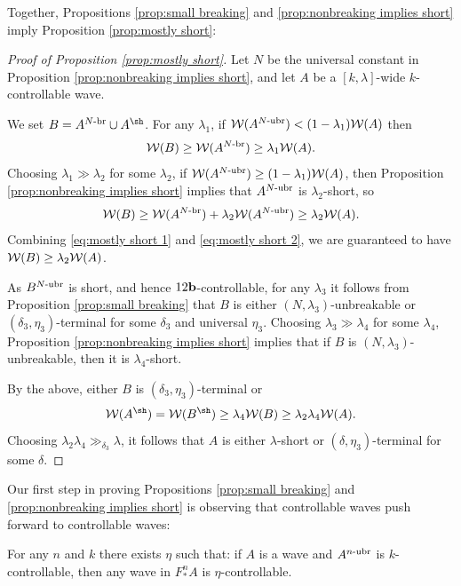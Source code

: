 \documentclass[12pt]{amsart}
\begin{document}
Together, Propositions \ref{prop:small breaking} and \ref{prop:nonbreaking implies short} imply Proposition  \ref{prop:mostly short}:
\begin{proof}[Proof of Proposition  \ref{prop:mostly short}]
	Let $N$ be the universal constant in Proposition \ref{prop:nonbreaking implies short}, and let $A$ be a $[k, \lambda]$-wide $k$-controllable wave. 
	
	
	We set $B= A^{N\mathhyphen\br}\cup A^{\sh}$. 	
	For any $\lambda_1$, if $\mathcal W(A^{N\text{-}{\mathrm{ubr}}})< (1-\lambda_1)\mathcal W(A)$ then 
	\begin{equation}\label{eq:mostly short 1}
		\mathcal W(B)\geq \mathcal W(A^{N\text{-}{\mathrm{br}}})\geq \lambda_1\mathcal W(A).
	\end{equation}
	Choosing $\lambda_1\gg\lambda_2$ for some $\lambda_2$, if $\mathcal W(A^{N\text{-}{\mathrm{ubr}}})\geq (1-\lambda_1)\mathcal W(A)$, then
	Proposition \ref{prop:nonbreaking implies short} implies that $A^{N\text{-}{\mathrm{ubr}}}$ is $\lambda_2$-short, so 
	\begin{equation}\label{eq:mostly short 2}
		\mathcal W(B)\geq \mathcal W(A^{N\text{-}{\mathrm{br}}})+ \lambda_2\mathcal W(A^{N\text{-}{\mathrm{ubr}}})\geq \lambda_2\mathcal W(A).
	\end{equation}
	Combining \eqref{eq:mostly short 1} and \eqref{eq:mostly short 2}, we are guaranteed to have $\mathcal W(B)\geq \lambda_2\mathcal W(A)$.
	
	As $B^{N\text{-}{\mathrm{ubr}}}$ is short, and hence  $12\mathbf b$-controllable, for any $\lambda_3$ it follows from Proposition \ref{prop:small breaking} that $B$ is either $(N, \lambda_3)$-unbreakable or $(\delta_3, \eta_3)$-terminal for some $\delta_3$ and universal $\eta_3$.
	Choosing $\lambda_3\gg\lambda_4$ for some $\lambda_4$, Proposition \ref{prop:nonbreaking implies short} implies that if $B$ is $(N, \lambda_3)$-unbreakable, then it is $\lambda_4$-short. 
	
	By the above,  either $B$ is $(\delta_3, \eta_3)$-terminal or 
	$$\WW(A^\sh) = \WW(B^\sh)\geq \lambda_4\WW(B)\geq \lambda_2\lambda_4\WW(A).$$
	Choosing $\lambda_2\lambda_4\gg_{\delta_3}\lambda$, it follows that $A$ is either $\lambda$-short or  $(\delta, \eta_3)$-terminal for some $\delta$.
\end{proof}



Our first step in proving  Propositions \ref{prop:small breaking} and \ref{prop:nonbreaking implies short} is observing that controllable waves push forward to controllable waves:

\begin{lem}\label{lem:pushing controllable}
	For any $n$ and $k$ there exists $\eta$ such that: if $A$ is a wave and $A^{n\text{-}{\mathrm{ubr}}}$ is  $k$-controllable, then any wave in $F_*^nA$ is  $\eta$-controllable.
\end{lem}
\end{document}
